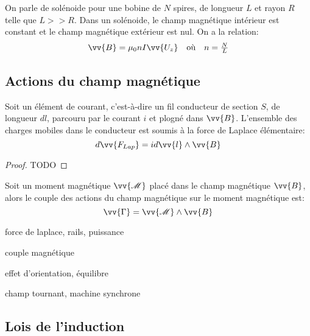 \begin{proposition}
    On parle de solénoide pour une bobine de $N$ spires, de longueur $L$ et rayon $R$ telle que $L >> R$.
    Dans un solénoide, le champ magnétique intérieur est constant et le champ magnétique extérieur est nul.
    On a la relation:
    \[\begin{array}{lcr}
         \vv{B} = \mu_{0}n I \vv{U_{z}} & \text{où} & n = \frac{N}{L}
    \end{array} \]
\end{proposition}

\subsection{Actions du champ magnétique}

\begin{proposition}
    Soit un élément de courant, c'est-à-dire un fil conducteur de section $S$, de longueur $dl$, parcouru par le courant $i$ et plogné dans $\vv{B}$.
    L'ensemble des charges mobiles dans le conducteur est soumis à la force de Laplace élémentaire:
    \[ d\vv{F_{Lap}} = i d\vv{l} \wedge \vv{B} \]
\end{proposition}

\begin{proof}
    TODO
\end{proof}

\begin{proposition}
    Soit un moment magnétique $\vv{\mathscr{M}}$ placé dans le champ magnétique $\vv{B}$, alors le couple des actions du champ magnétique sur le moment magnétique est:
    \[ \vv{\Gamma} = \vv{\mathscr{M}} \wedge \vv{B} \]
\end{proposition}

\begin{proposition}
    
\end{proposition}

force de laplace, rails, puissance

couple magnétique

effet d'orientation, équilibre

champ tournant, machine synchrone

\subsection{Lois de l'induction}

